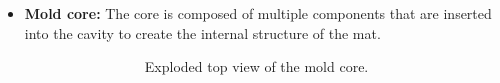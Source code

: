 \begin{itemize}
    \item \textbf{Mold core: } The core is composed of multiple components that are inserted into the cavity to create the internal structure of the mat.
    \begin{figure} %
        \centering
        \begin{subfigure}[b]{0.6\textwidth}
            \begin{subfigure}[b]{0.475\textwidth}
                \centering
                \caption{Exploded top view of the mold core.}
            \end{subfigure}
            \hfill
            \begin{subfigure}[b]{0.475\textwidth}
                \centering
                \resizebox{\textwidth}{!}{
}
\end{subfigure}
\end{subfigure}
\end{figure}
\end{itemize}
